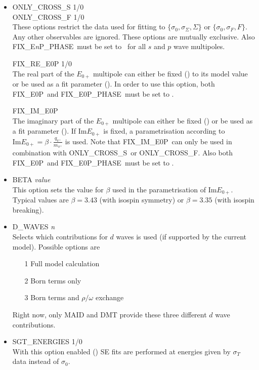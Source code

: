 \documentclass[a4paper,10pt]{article}
\def\Im{\mathrm{Im}}
\def\tt{\ttfamily}
\def\rm{\rmfamily}
\begin{document}
\begin{itemize}
\item
\tt ONLY\_CROSS\_S 1/0\rm\\
\tt ONLY\_CROSS\_F 1/0\rm\\
These options restrict the data used for fitting to $\lbrace\sigma_0,\sigma_\Sigma, \Sigma\rbrace$ or
$\lbrace\sigma_0,\sigma_F, F\rbrace$. Any other observables are ignored.
These options are mutually exclusive. Also \tt FIX\_E\textit{n}P\_PHASE\rm\ must be set to \tt0\rm\
for all $s$ and $p$ wave multipoles.

\tt FIX\_RE\_E0P 1/0\rm\\
The real part of the $E_{0+}$ multipole can either be fixed (\tt1\rm) to its model value or be used as a fit parameter (\tt0\rm).
In order to use this option, both \tt FIX\_E0P\rm\ and \tt FIX\_E0P\_PHASE\rm\ must be set to \tt0\rm.

\tt FIX\_IM\_E0P\rm\\
The imaginary part of the $E_{0+}$ multipole can either be fixed (\tt1\rm) or be used as a fit parameter (\tt0\rm). If $\Im E_{0+}$
is fixed, a parametrisation according to $\Im E_{0+} = \beta \cdot \frac{q_{\pi^+}}{m_{\pi^+}}$ is used.
Note that \tt FIX\_IM\_E0P\rm\ can only be used in combination with \tt ONLY\_CROSS\_S\rm\
or \tt ONLY\_CROSS\_F\rm. Also 
both \tt FIX\_E0P\rm\ and \tt FIX\_E0P\_PHASE\rm\ must be set to \tt0\rm.

\item
\tt BETA \textit{value}\rm\\
This option sets the value for $\beta$ used in the parametrisation of $\Im E_{0+}$. Typical values are
$\beta = 3.43$ (with isospin symmetry) or $\beta = 3.35$ (with isospin breaking).

\item
\tt D\_WAVES \textit{n}\rm\\
Selects which contributions for $d$ waves is used (if supported by the current model). Possible options are
\vspace{-0.5em}\begin{enumerate}
\item[1\:\:] Full model calculation
\item[2\:\:] Born terms only
\item[3\:\:] Born terms and $\rho/\omega$ exchange
\end{enumerate}
\vspace{-0.5em}Right now, only MAID and DMT provide these three different $d$ wave contributions.

\item
\tt SGT\_ENERGIES 1/0\rm\\
With this option enabled (\tt1\rm) SE fits are performed at energies given by $\sigma_T$ data instead of $\sigma_0$.
\end{itemize}
\end{document}
